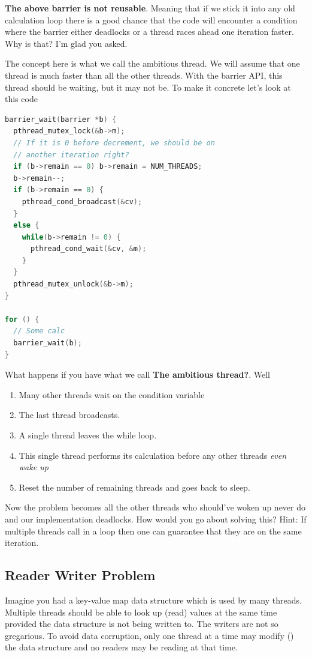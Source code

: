 \textbf{The above barrier is not reusable}.
Meaning that if we stick it into any old calculation loop there is a good chance that the code will encounter a condition where the barrier either deadlocks or a thread races ahead one iteration faster.
Why is that?
I'm glad you asked.

The concept here is what we call the ambitious thread.
We will assume that one thread is much faster than all the other threads.
With the barrier API, this thread should be waiting, but it may not be.
To make it concrete let's look at this code

\begin{lstlisting}[language=C]
barrier_wait(barrier *b) {
  pthread_mutex_lock(&b->m);
  // If it is 0 before decrement, we should be on
  // another iteration right?
  if (b->remain == 0) b->remain = NUM_THREADS;
  b->remain--;
  if (b->remain == 0) {
    pthread_cond_broadcast(&cv);
  }
  else {
    while(b->remain != 0) {
      pthread_cond_wait(&cv, &m);
    }
  }
  pthread_mutex_unlock(&b->m);
}

for () {
  // Some calc
  barrier_wait(b);
}
\end{lstlisting}

What happens if you have what we call \textbf{The ambitious thread?}. Well
\begin{enumerate}
\item Many other threads wait on the condition variable
\item The last thread broadcasts.
\item A single thread leaves the while loop.
\item This single thread performs its calculation before any other threads \textit{even wake up}
\item Reset the number of remaining threads and goes back to sleep.
\end{enumerate}

Now the problem becomes all the other threads who should've woken up never do and our implementation deadlocks.
How would you go about solving this?
Hint: If multiple threads call  in a loop then one can guarantee that they are on the same iteration.

\subsection{Reader Writer Problem}

Imagine you had a key-value map data structure which is used by many threads.
Multiple threads should be able to look up (read) values at the same time provided the data structure is not being written to.
The writers are not so gregarious.
To avoid data corruption, only one thread at a time may modify () the data structure and no readers may be reading at that time.

